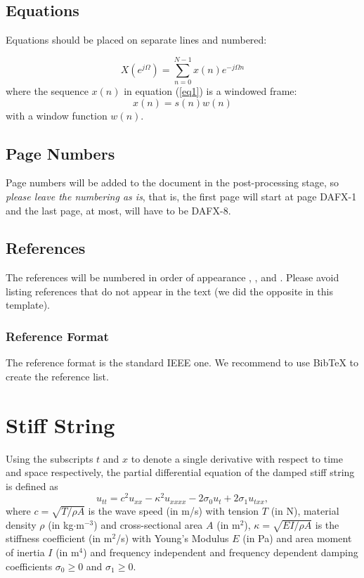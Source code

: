 \documentclass[twoside,a4paper]{article}
\begin{document}
\subsection{Equations}
Equations should be placed on separate lines and numbered:

\begin{equation}
	X(e^{j\Omega})=\sum_{n=0}^{N-1}x(n)e^{-j\Omega n}
	\label{eq1}
	\end{equation}
	where the sequence $x(n)$ in equation (\ref{eq1}) is a windowed frame:
	\begin{equation}
	x(n)=s(n) w(n)
	\label{eq2}
\end{equation}
%
with a window function $w(n)$.


\subsection{Page Numbers}
Page numbers will be added to the document in the post-processing stage, so {\em please leave the numbering as is},
that is, the first page will start at page DAFX-1 and the last page, at most, will have to be DAFX-8.


\subsection{References}
The references will be numbered in order of appearance \cite{Mitra:Kaiser:1993:DSP:handbook}, \cite{Haykin:1991:adaptive:filter}, \cite{Moorer:2000:AES:audio:millenium} and \cite{Nackaerts:2001:ICMC}. Please avoid listing references that do not appear in the text (we did the opposite in this template).


\subsubsection{Reference Format}
The reference format is the standard IEEE one. We recommend to use BibTeX to create the reference list.

\section{Stiff String}
Using the subscripts $t$ and $x$ to denote a single derivative with respect to time and space respectively, the partial differential equation of the damped stiff string is defined as \cite{Bilbao2009}
\begin{equation}\label{eq:PDE}
    u_{tt} = c^2u_{xx}-\kappa^2u_{xxxx}-2\sigma_0u_t+2\sigma_1u_{txx},
\end{equation}
where $c = \sqrt{T/\rho A}$ is the wave speed (in m/s) with tension $T$ (in N), material density $\rho$ (in kg$\cdot$m$^{-3}$) and cross-sectional area $A$ (in m$^2$), $\kappa = \sqrt{EI/\rho A}$ is the stiffness coefficient (in m$^2$/s) with Young's Modulus $E$ (in Pa) and area moment of inertia $I$ (in m$^4$) and frequency independent and frequency dependent damping coefficients $\sigma_0 \geq 0$ and $\sigma_1 \geq 0$.
\end{document}
